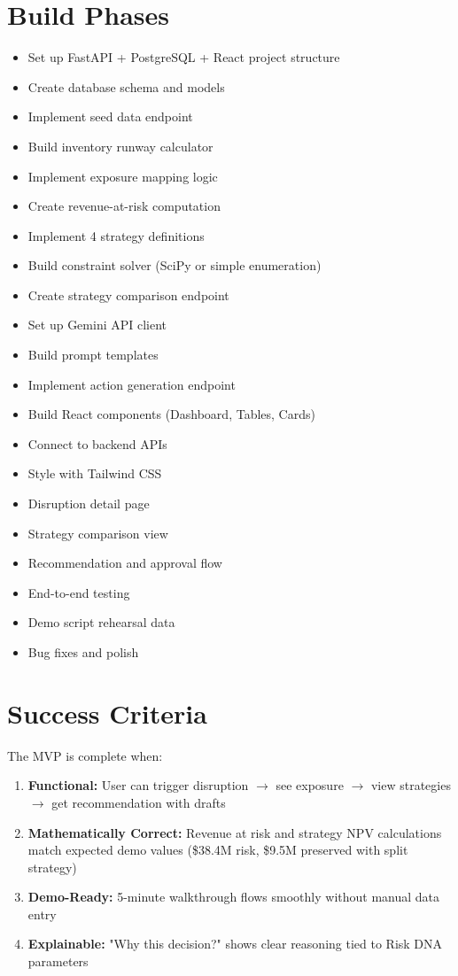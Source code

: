 \documentclass[11pt]{article}
\begin{document}
\section{Build Phases}

\begin{itemize}
    \item Set up FastAPI + PostgreSQL + React project structure
    \item Create database schema and models
    \item Implement seed data endpoint
    \item Build inventory runway calculator
    \item Implement exposure mapping logic
    \item Create revenue-at-risk computation
    \item Implement 4 strategy definitions
    \item Build constraint solver (SciPy or simple enumeration)
    \item Create strategy comparison endpoint
    \item Set up Gemini API client
    \item Build prompt templates
    \item Implement action generation endpoint
    \item Build React components (Dashboard, Tables, Cards)
    \item Connect to backend APIs
    \item Style with Tailwind CSS
    \item Disruption detail page
    \item Strategy comparison view
    \item Recommendation and approval flow
    \item End-to-end testing
    \item Demo script rehearsal data
    \item Bug fixes and polish
\end{itemize}

\section{Success Criteria}

The MVP is complete when:

\begin{enumerate}
    \item \textbf{Functional:} User can trigger disruption $\rightarrow$ see exposure $\rightarrow$ view strategies $\rightarrow$ get recommendation with drafts
    \item \textbf{Mathematically Correct:} Revenue at risk and strategy NPV calculations match expected demo values (\$38.4M risk, \$9.5M preserved with split strategy)
    \item \textbf{Demo-Ready:} 5-minute walkthrough flows smoothly without manual data entry
    \item \textbf{Explainable:} "Why this decision?" shows clear reasoning tied to Risk DNA parameters
\end{enumerate}
\end{document}
